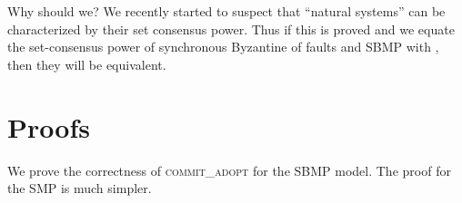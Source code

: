 \documentclass[11pt]{article}
\newcommand{\SMPfm}{\mbox{SMP\!}\xspace}
\newcommand{\SBMPfm}{\mbox{SBMP\!}\xspace}
\newcommand{\ca}{{\small\textsc{commit\!\_adopt}}\xspace}
\begin{document}
Why should we? We recently \cite{CSC} 
started to suspect that ``natural systems'' can be characterized 
by their set consensus power. Thus if this is proved and we equate the set-consensus power of synchronous Byzantine
of  faults and \SBMPfm with , then they will be equivalent.

 
\newpage

\thispagestyle{empty}


\newpage
\appendix


\section{Proofs}\label{sec:Proofs}
We prove the correctness of \ca for the \SBMPfm model. The proof for the \SMPfm is much simpler.
\end{document}
